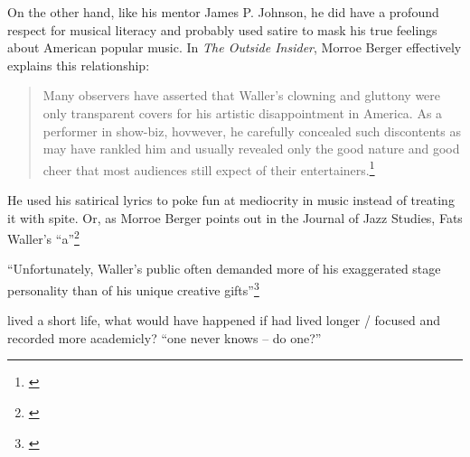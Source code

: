 \documentclass[11pt]{report}
\begin{document}
	On the other hand, like his mentor James P. Johnson, he did have a profound respect for musical literacy and probably used satire to mask his true feelings about American popular music. In \emph{The Outside Insider}, Morroe Berger effectively explains this relationship:
	\begin{quote}
		Many observers have asserted that Waller's clowning and gluttony were only transparent covers for his artistic disappointment in America. As a performer in show-biz, hovwever, he carefully concealed such discontents as may have rankled him and usually revealed only the good nature and good cheer that most audiences still expect of their entertainers.\footnote{\cite[4]{outside-insider}}
	\end{quote}

	He used his satirical lyrics to poke fun at mediocrity in music instead of treating it with spite. Or, as Morroe Berger points out in the Journal of Jazz Studies, Fats Waller's ``a''\footnote{\cite[4]{outside-insider}}


	\label{sec:conclusion}

	``Unfortunately, Waller's public often demanded more of his exaggerated stage personality than of his unique creative gifts''\footnote{\cite[40]{grove-book:waller}}

	lived a short life, what would have happened if had lived longer / focused and recorded more academicly? ``one never knows -- do one?''



\end{document}
